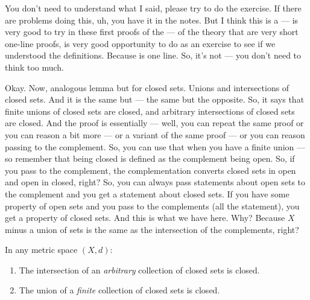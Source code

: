 \begin{spoken-clean}[00:19:05 - 00:21:42]
You don't need to understand what I said, please try to do the exercise. If there are problems doing this, uh, you have it in the notes. But I think this is a --- is very good to try in these first proofs of the --- of the theory that are very short one-line proofs, is very good opportunity to do as an exercise to see if we understood the definitions. Because is one line. So, it's not --- you don't need to think too much.

Okay. Now, analogous lemma but for closed sets. Unions and intersections of closed sets. And it is the same but --- the same but the opposite. So, it says that finite unions of closed sets are closed, and arbitrary intersections of closed sets are closed. And the proof is essentially --- well, you can repeat the same proof or you can reason a bit more --- or a variant of the same proof --- or you can reason passing to the complement. So, you can use that when you have a finite union --- so remember that being closed is defined as the complement being open. So, if you pass to the complement, the complementation converts closed sets in open and open in closed, right? So, you can always pass statements about open sets to the complement and you get a statement about closed sets. If you have some property of open sets and you pass to the complements (all the statement), you get a property of closed sets. And this is what we have here. Why? Because $X$ minus a union of sets is the same as the intersection of the complements, right?
\end{spoken-clean}

\begin{nice-box}
\setcounter{theorem}{43}
\begin{proposition}\label{prop:closed-sets-unions-intersections}
In any metric space $(X, d)$:
\begin{enumerate}
    \setcounter{enumi}{0} \item The intersection of an \emph{arbitrary} collection of closed sets is closed.
    \setcounter{enumi}{1} \item The union of a \emph{finite} collection of closed sets is closed.
\end{enumerate}
\end{proposition}
\end{nice-box}

